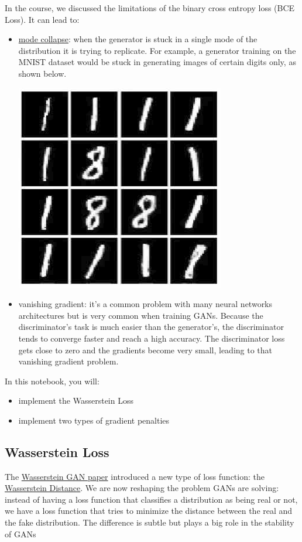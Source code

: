 In the course, we discussed the limitations of the binary cross entropy
loss (BCE Loss). It can lead to: 
\begin{itemize}
\item \href{https://developers.google.com/machine-learning/gan/problems}{mode collapse}: when the generator is stuck in a single mode of the distribution it is trying to replicate. For example, a generator training on the MNIST dataset would be stuck in generating images of certain digits only, as shown below.

    \includegraphics[width=0.5\linewidth]{img//genAdvNet//modernGAN/collapse.png}

\item vanishing gradient: it's a common problem with many neural networks architectures but is very common when training GANs. Because the discriminator's task is much easier than the generator's, the discriminator tends to converge faster and reach a high accuracy. The discriminator loss gets close to zero and the gradients become very small, leading to that vanishing gradient problem.
\end{itemize}

In this notebook, you will: 
\begin{itemize}
    \item implement the Wasserstein Loss
    \item implement two types of gradient penalties
\end{itemize}

\subsection{Wasserstein Loss}

The \href{https://arxiv.org/pdf/1701.07875.pdf}{Wasserstein GAN paper}
introduced a new type of loss function: the
\href{https://en.wikipedia.org/wiki/Wasserstein_metric}{Wasserstein
Distance}. We are now reshaping the problem GANs are solving: instead of
having a loss function that classifies a distribution as being real or
not, we have a loss function that tries to minimize the distance between
the real and the fake distribution. The difference is subtle but plays a
big role in the stability of GANs

